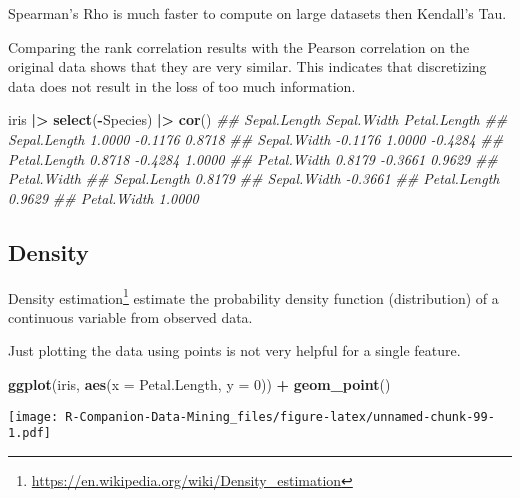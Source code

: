 \documentclass[
  notitlepage]{book}
\newenvironment{Shaded}{\begin{snugshade}}{\end{snugshade}}
\newcommand{\CommentTok}[1]{\textcolor[rgb]{0.56,0.35,0.01}{\textit{#1}}}
\newcommand{\DataTypeTok}[1]{\textcolor[rgb]{0.13,0.29,0.53}{#1}}
\newcommand{\DecValTok}[1]{\textcolor[rgb]{0.00,0.00,0.81}{#1}}
\newcommand{\ErrorTok}[1]{\textcolor[rgb]{0.64,0.00,0.00}{\textbf{#1}}}
\newcommand{\KeywordTok}[1]{\textcolor[rgb]{0.13,0.29,0.53}{\textbf{#1}}}
\newcommand{\NormalTok}[1]{#1}
\newcommand{\OperatorTok}[1]{\textcolor[rgb]{0.81,0.36,0.00}{\textbf{#1}}}
\newcommand{\StringTok}[1]{\textcolor[rgb]{0.31,0.60,0.02}{#1}}
\DeclareRobustCommand{\href}[2]{#2\footnote{\url{#1}}}
\begin{document}
Spearman's Rho is much faster to compute on large datasets then
Kendall's Tau.

Comparing the rank correlation results with the Pearson correlation on
the original data shows that they are very similar. This indicates that
discretizing data does not result in the loss of too much information.

\begin{Shaded}
\begin{Highlighting}[]
\NormalTok{iris }\OperatorTok{|}\ErrorTok{\textgreater{}}\StringTok{ }
\StringTok{  }\KeywordTok{select}\NormalTok{(}\OperatorTok{{-}}\NormalTok{Species) }\OperatorTok{|}\ErrorTok{\textgreater{}}\StringTok{ }
\StringTok{  }\KeywordTok{cor}\NormalTok{()}
\CommentTok{\#\#              Sepal.Length Sepal.Width Petal.Length}
\CommentTok{\#\# Sepal.Length       1.0000     {-}0.1176       0.8718}
\CommentTok{\#\# Sepal.Width       {-}0.1176      1.0000      {-}0.4284}
\CommentTok{\#\# Petal.Length       0.8718     {-}0.4284       1.0000}
\CommentTok{\#\# Petal.Width        0.8179     {-}0.3661       0.9629}
\CommentTok{\#\#              Petal.Width}
\CommentTok{\#\# Sepal.Length      0.8179}
\CommentTok{\#\# Sepal.Width      {-}0.3661}
\CommentTok{\#\# Petal.Length      0.9629}
\CommentTok{\#\# Petal.Width       1.0000}
\end{Highlighting}
\end{Shaded}

\hypertarget{density}{%
\subsection{Density}\label{density}}

\href{https://en.wikipedia.org/wiki/Density_estimation}{Density estimation}
estimate the probability density function
(distribution) of a continuous variable from observed data.

Just plotting the data using points is not very helpful for a single
feature.

\begin{Shaded}
\begin{Highlighting}[]
\KeywordTok{ggplot}\NormalTok{(iris, }\KeywordTok{aes}\NormalTok{(}\DataTypeTok{x =}\NormalTok{ Petal.Length, }\DataTypeTok{y =} \DecValTok{0}\NormalTok{)) }\OperatorTok{+}\StringTok{ }\KeywordTok{geom\_point}\NormalTok{()}
\end{Highlighting}
\end{Shaded}

\texttt{[image: R-Companion-Data-Mining\_files/figure-latex/unnamed-chunk-99-1.pdf]}
\end{document}
